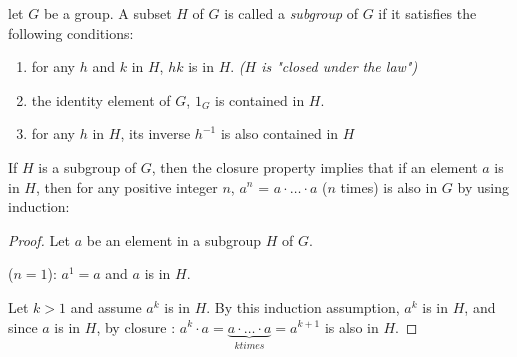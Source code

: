 \begin{boxedDefinition}[Subgroups]\label{def:subgroup}
    let $G$ be a group. A subset $H$ of $G$ is called a \textit{subgroup} of $G$ if it satisfies the following conditions:
    \begin{enumerate}  
        \item \label{def:subgroup-closure} for any $h$ and $k$ in $H$, $hk$ is in $H$. \textit{($H$ is "closed under the law")}
        \item \label{def:subgroup-identity} the identity element of $G$, $1_G$ is contained in $H$.
        \item \label{def:subgroup-inverse} for any $h$ in $H$, its inverse $h^{-1}$ is also contained in $H$
    \end{enumerate}
\end{boxedDefinition}

\begin{boxedRemark} \label{rem:induction-closure}
    If $H$ is a subgroup of $G$, then the closure property implies that if an element $a$ is in $H$, then for any positive integer $n$, $a^n$ = $a \cdot \hdots \cdot a$ ($n$ times) is also in $G$ by using induction: 
\end{boxedRemark}
\begin{proof}
    Let $a$ be an element in a subgroup $H$ of $G$. 

    ($n = 1$): $a^1 = a$ and $a$ is in $H$. 

    Let $k > 1$ and assume $a^k$ is in $H$. By this induction assumption, $a^k$ is in $H$, and since $a$ is in $H$, by closure : $a^k \cdot a = \underbrace{a \cdot \hdots \cdot a}_{k times} = a^{k+1}$ is also in $H$.
\end{proof}

